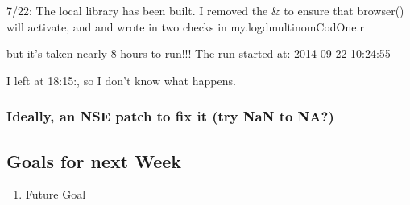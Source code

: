 7/22: The local library has been built. I removed the \& to ensure that browser() will activate, and and wrote in two checks in my.logdmultinomCodOne.r



but it's taken nearly 8 hours to run!!! The run started at: 2014-09-22 10:24:55 

I left at 18:15:, so I don't know what happens.

\subsubsection{Ideally, an NSE patch to fix it (try NaN to NA?)}




\subsection{Goals for next Week}
\begin{enumerate}
\item Future Goal
\end{enumerate}


